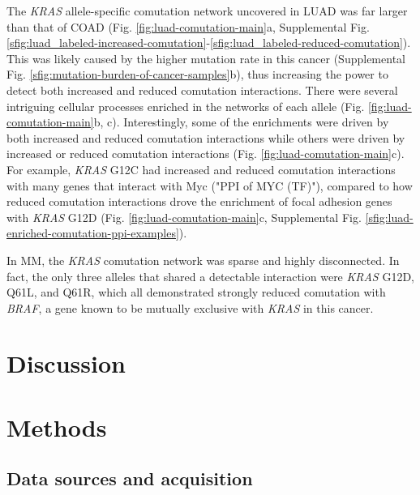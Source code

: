 \documentclass[english, 12pt, letterpaper]{article}
\newcommand{\KRAS}{\emph{KRAS}}
\begin{document}

The \KRAS{} allele-specific comutation network uncovered in LUAD was far larger than that of COAD (Fig. \ref{fig:luad-comutation-main}a, Supplemental Fig. \ref{sfig:luad_labeled-increased-comutation}-\ref{sfig:luad_labeled-reduced-comutation}).
This was likely caused by the higher mutation rate in this cancer (Supplemental Fig. \ref{sfig:mutation-burden-of-cancer-samples}b), thus increasing the power to detect both increased and reduced comutation interactions.
There were several intriguing cellular processes enriched in the networks of each allele (Fig. \ref{fig:luad-comutation-main}b, c).
Interestingly, some of the enrichments were driven by both increased and reduced comutation interactions while others were driven by increased or reduced comutation interactions (Fig. \ref{fig:luad-comutation-main}c).
For example, \KRAS{} G12C had increased and reduced comutation interactions with many genes that interact with Myc ("PPI of MYC (TF)"), compared to how reduced comutation interactions drove the enrichment of focal adhesion genes with \KRAS{} G12D (Fig. \ref{fig:luad-comutation-main}c, Supplemental Fig. \ref{sfig:luad-enriched-comutation-ppi-examples}).

In MM, the \KRAS{} comutation network was sparse and highly disconnected.
In fact, the only three alleles that shared a detectable interaction were \KRAS{} G12D, Q61L, and Q61R, which all demonstrated strongly reduced comutation with \emph{BRAF}, a gene known to be mutually exclusive with \KRAS{} in this cancer.



\section*{Discussion}





\section*{Methods}

\subsection*{Data sources and acquisition}
\end{document}
